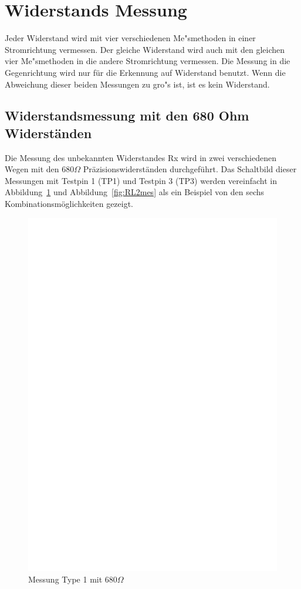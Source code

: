 \section{Widerstands Messung}
Jeder Widerstand wird mit vier verschiedenen Me"smethoden in einer Stromrichtung vermessen.
Der gleiche Widerstand wird auch mit den gleichen vier Me"smethoden in die andere Stromrichtung vermessen.
Die Messung in die Gegenrichtung wird nur f\"ur die Erkennung auf Widerstand benutzt.
Wenn die Abweichung dieser beiden Messungen zu gro"s ist, ist es kein Widerstand.

\subsection{Widerstandsmessung mit den 680 Ohm Widerst\"anden}
Die Messung des unbekannten Widerstandes Rx wird in zwei verschiedenen Wegen mit den \(680\Omega\) Pr\"azisionswiderst\"anden
 durchgef\"uhrt.
Das Schaltbild dieser Messungen mit Testpin 1 (TP1) und Testpin 3 (TP3) werden vereinfacht in Abbildung~\ref{fig:RL1mes} und Abbildung~\ref{fig:RL2mes} als ein Beispiel von den sechs Kombinationsm\"oglichkeiten gezeigt.

\begin{figure}[H]
\centering
\includegraphics[]{../FIG/ResistormessL1.eps}
\caption{Messung Type 1 mit \(680\Omega\) }
\label{fig:RL1mes}
\end{figure}

